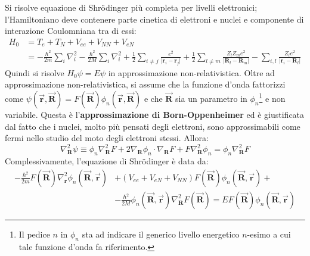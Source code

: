 \documentclass[10pt, a4paper]{scrartcl}
\numberwithin{equation}{subsection}
\theoremstyle{style1}
\begin{document}
Si risolve equazione di Shr\"odinger pi\`u completa per livelli elettronici; l'Hamiltoniano deve contenere parte cinetica di elettroni e nuclei e componente di interazione Coulomniana tra di essi:
\begin{equation}
	\begin{split}
		H_0 &= T_e + T_N + V_{ee} + V_{NN} + V_{eN}   \\
		    &= - \frac{\hbar ^2}{2m} \sum_{i}^{} \nabla _i^2 - \frac{\hbar ^2 }{2M} \sum_{i}^{} \nabla _i^2 + \frac{1}{2} \sum_{i\neq j}^{} \frac{e^2}{\lvert \mathbf{r} _i - \mathbf{r} _j \rvert } + \frac{1}{2}\sum_{l\neq m }^{} \frac{Z_l Z_m e^2 }{\lvert \mathbf{R} _l - \mathbf{R}_m  \rvert } - \sum_{i,l}^{} \frac{Z_l e^2}{\lvert \mathbf{r} _i - \mathbf{R} _l \rvert }
	\end{split}
\end{equation}
Quindi si risolve $H_0 \psi  = E \psi $ in approssimazione non-relativistica.
Oltre ad approssimazione non-relativistica, si assume che la funzione d'onda fattorizzi come $\psi (\vec{\mathbf{r} }, \vec{\mathbf{R} }) = F( \vec{\mathbf{R} }) \phi _n (\vec{\mathbf{r} }, \vec{\mathbf{R} })$ e che $\vec{\mathbf{R} }$ sia un parametro in $\phi _n$\footnote{Il pedice $n$ in $\phi _n$ sta ad indicare il generico livello energetico $n$-esimo a cui tale funzione d'onda fa riferimento.} e non variabile.
Questa \`e l'\textbf{approssimazione di Born-Oppenheimer} ed \`e giustificata dal fatto che i nuclei, molto pi\`u pensati degli elettroni, sono approssimabili come fermi nello studio del moto degli elettroni stessi. Allora:
\begin{equation}
	\nabla ^2 _\mathbf{R} \psi  \equiv \phi _n \nabla ^2 _\mathbf{R} F + 2 \nabla _\mathbf{R} \phi _n \cdot \nabla _\mathbf{R} F + F \nabla ^2_\mathbf{R} \phi _n = \phi _n \nabla ^2_\mathbf{R} F
\end{equation}
Complessivamente, l'equazione di Shr\"odinger \`e data da:
\begin{equation}
	\begin{split}
		-\frac{\hbar ^2}{2m} F( \vec{\mathbf{R} }) \nabla ^2_\mathbf{r} \phi _n (\vec{\mathbf{R} }, \vec{\mathbf{r} }) &+ ( V_{ee}  + V_{eN}+V_{N N} ) F(\vec{\mathbf{R} }) \phi_n (\vec{\mathbf{R} }, \vec{\mathbf{r} }) + \operatorname{} \\
				&- \frac{\hbar ^2}{2M} \phi _n (\vec{\mathbf{R} }, \vec{\mathbf{r} }) \nabla ^2_\mathbf{R} F(\vec{\mathbf{R} })  = E F(\vec{\mathbf{R} }) \phi _n(\vec{\mathbf{R} }, \vec{\mathbf{r} })
	\end{split}
\end{equation}
\end{document}
